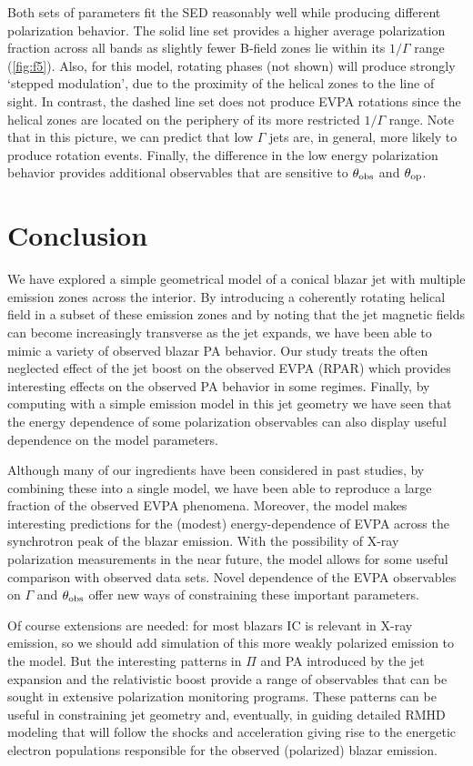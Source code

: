 Both sets of parameters fit the SED reasonably well while producing different polarization behavior. The solid line set provides a higher average polarization fraction across all bands as slightly fewer B-field zones lie within its $1/\Gamma$ range (\cref{fig:f5}). Also, for this model, rotating phases (not shown) will produce strongly `stepped modulation', due to the proximity of the helical zones to the line of sight. In contrast, the dashed line set does not produce EVPA rotations since the helical zones are located on the periphery of its more restricted $1/\Gamma$ range. Note that in this picture, we can predict that low $\Gamma$ jets are, in general, more likely to produce rotation events. Finally, the difference in the low energy polarization behavior provides additional observables that are sensitive to $\theta_{\rm obs}$ and $\theta_{\rm op}$.

\section{Conclusion}

We have explored a simple geometrical model of a conical blazar jet with multiple emission zones across the interior. By introducing a coherently rotating helical field in a subset of these emission zones and by noting that the jet magnetic fields can become increasingly transverse as the jet expands, we have been able to mimic a variety of observed blazar PA behavior. Our study treats the often neglected effect of the jet boost on the observed EVPA (RPAR) which provides interesting effects on the observed PA behavior in some regimes. Finally, by computing with a simple emission model in this jet geometry we have seen that the energy dependence of some polarization observables can also display useful dependence on the model parameters. 

	Although many of our ingredients have been considered in past studies, by combining these into a single model, we have been able to reproduce a large fraction of the observed EVPA phenomena. Moreover, the model makes interesting predictions for the (modest) energy-dependence of EVPA across the synchrotron peak of the blazar emission. With the possibility of X-ray polarization measurements in the near future, the model allows for some useful comparison with observed data sets. Novel dependence of the EVPA observables on $\Gamma$ and $\theta_{\rm obs}$ offer new ways of constraining these important parameters. 
    
Of course extensions are needed: for most blazars IC is relevant in X-ray %
emission, so we should add simulation of this more weakly polarized emission to the model. But the interesting patterns in $\Pi$ and PA introduced by the jet expansion and the relativistic boost provide a range of observables that can be sought in extensive polarization monitoring programs. These patterns can be useful in constraining jet geometry and, eventually, in guiding detailed RMHD modeling that will follow the shocks and acceleration giving rise to the energetic electron populations responsible for the observed (polarized) blazar emission.